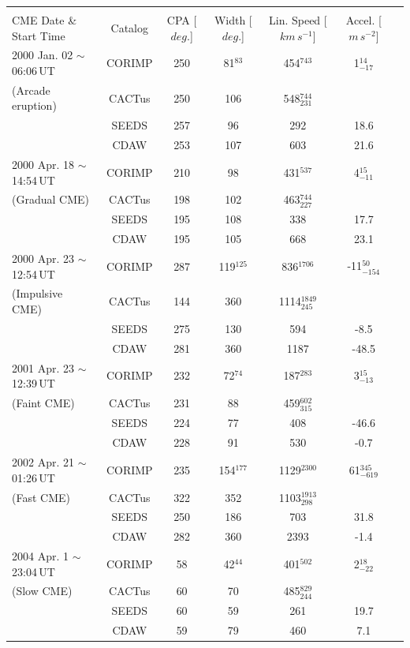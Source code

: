 \documentclass[referee,a4paper,12pt,traditabstract]{swsc}
\begin{document}
\begin{linenumbers}
\begin{table}[!t]
\begin{tabular}{l*{5}{c}r}
\multicolumn{6}{c}{} \\
CME Date \& Start Time & Catalog              & CPA [$deg.$] & Width [$deg.$] & Lin. Speed [$km\,s^{-1}$] & Accel. [$m\,s^{-2}$]  \\
\hline
\hline
2000 Jan. 02 $\sim$06:06\,UT & CORIMP         & 250   & 81$^{83}$   & 454$^{743}$ &  1$_{-17}^{14}$  \\
(Arcade eruption) & CACTus          & 250 & 106 & 548$_{231}^{744}$ &     \\
& SEEDS        & 257 & 96 & 292 & 18.6  \\
& CDAW     & 253 & 107 & 603 & 21.6 \\
\hline
2000 Apr. 18 $\sim$14:54\,UT & CORIMP      & 210 & 98 & 431$^{537}$ & 4$_{-11}^{15}$   \\
(Gradual CME) & CACTus     & 198 & 102 & 463$_{227}^{744}$ &     \\
& SEEDS        & 195 & 108 & 338 & 17.7    \\
& CDAW         & 195 & 105 & 668 & 23.1    \\
\hline
2000 Apr. 23 $\sim$12:54\,UT & CORIMP   & 287 & 119$^{125}$ & 836$^{1706}$ & -11$_{-154}^{50}$       \\
(Impulsive CME) & CACTus  & 144 & 360 & 1114$_{245}^{1849}$ &            \\
& SEEDS  & 275 & 130 & 594 & -8.5        \\
& CDAW      & 281 & 360 & 1187 & -48.5 \\
\hline
2001 Apr. 23 $\sim$12:39\,UT & CORIMP   & 232 & 72$^{74}$ & 187$^{283}$ & 3$_{-13}^{15}$ \\
(Faint CME) & CACTus  & 231 & 88 & 459$_{315}^{602}$ &  \\
& SEEDS    & 224 & 77 & 408 & -46.6  \\
& CDAW      & 228 & 91 & 530 & -0.7 \\
\hline
2002 Apr. 21 $\sim$01:26\,UT & CORIMP   & 235 & 154$^{177}$ & 1129$^{2300}$ & 61$_{-619}^{345}$ \\
(Fast CME) & CACTus   & 322 & 352 & 1103$_{298}^{1913}$ &  \\
& SEEDS    & 250 & 186 & 703 & 31.8 \\
& CDAW      & 282 & 360 & 2393 & -1.4 \\
\hline
2004 Apr. 1 $\sim$23:04\,UT & CORIMP   & 58 & 42$^{44}$ & 401$^{502}$ & 2$_{-22}^{18}$ \\
(Slow CME) & CACTus  & 60 & 70 & 485$_{244}^{829}$ & \\
& SEEDS     & 60 & 59 & 261 & 19.7 \\
& CDAW      & 59 & 79 & 460 & 7.1 \\


\end{tabular}
\end{table}
\end{linenumbers}
\end{document}

